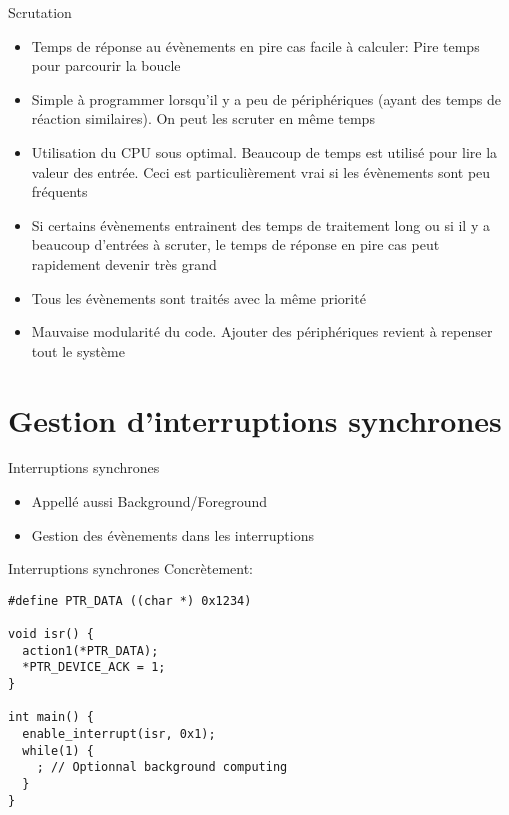 \begin{frame}{Scrutation}
  \begin{itemize} 
  \item Temps de réponse au  évènements en pire cas facile à calculer:
    Pire temps pour parcourir la boucle
  \item Simple à programmer lorsqu'il  y a peu de périphériques (ayant
    des temps  de réaction  similaires). On peut  les scruter  en même
    temps
  \item Utilisation du CPU sous optimal. Beaucoup de temps est utilisé
    pour lire la valeur des  entrée. Ceci est particulièrement vrai si
    les évènements sont peu fréquents
  \item Si certains évènements entrainent des temps de traitement long
    ou si il y a beaucoup  d'entrées à scruter, le temps de réponse en
    pire cas peut rapidement devenir très grand
  \item Tous les évènements sont traités avec la même priorité
  \item  Mauvaise modularité  du code.  Ajouter des périphériques
    revient à repenser tout le système
  \end{itemize} 
\end{frame} 

\section{Gestion d'interruptions synchrones} 

\begin{frame}{Interruptions synchrones}
  \begin{itemize} 
  \item Appellé aussi Background/Foreground
  \item Gestion des évènements dans les interruptions
  \end{itemize} 
  \begin{center}
  \end{center}
\end{frame}

\begin{frame}[fragile]{Interruptions synchrones}
  Concrètement:
  \begin{lstlisting}
#define PTR_DATA ((char *) 0x1234)

void isr() {
  action1(*PTR_DATA);
  *PTR_DEVICE_ACK = 1;
}

int main() {
  enable_interrupt(isr, 0x1);
  while(1) {
    ; // Optionnal background computing 
  }
}
  \end{lstlisting} 
\end{frame}

